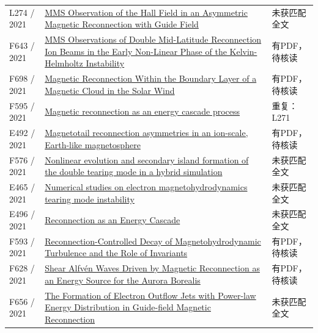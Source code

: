 \begin{longtable}{P{24mm}P{97mm}P{27mm}}
L274 / 2021 & \href{https://doi.org/10.3847/1538-4357/ac31b1}{MMS Observation of the Hall Field in an Asymmetric Magnetic Reconnection with Guide Field} & 未获匹配全文\\

F643 / 2021 & \href{https://doi.org/10.3389/fspas.2021.760885}{MMS Observations of Double Mid-Latitude Reconnection Ion Beams in the Early Non-Linear Phase of the Kelvin-Helmholtz Instability} & 有PDF，待核读\\

F698 / 2021 & \href{https://doi.org/10.1029/2021ja029415}{Magnetic Reconnection Within the Boundary Layer of a Magnetic Cloud in the Solar Wind} & 有PDF，待核读\\

F595 / 2021 & \href{https://doi.org/10.48550/arxiv.2104.12013}{Magnetic reconnection as an energy cascade process} & 重复：L271\\

E492 / 2021 & \href{https://doi.org/10.5194/angeo-39-991-2021}{Magnetotail reconnection asymmetries in an ion-scale,  Earth-like magnetosphere} & 有PDF，待核读\\

F576 / 2021 & \href{https://doi.org/10.1088/2058-6272/abe038}{Nonlinear evolution and secondary island formation of the double tearing mode in a hybrid simulation} & 未获匹配全文\\

E465 / 2021 & \href{https://doi.org/10.1063/5.0066269}{Numerical studies on electron magnetohydrodynamics tearing mode instability} & 未获匹配全文\\

E496 / 2021 & \href{https://doi.org/10.1002/essoar.10508377.1}{Reconnection as an Energy Cascade} & 未获匹配全文\\

F593 / 2021 & \href{https://doi.org/10.1103/physrevx.11.041005}{Reconnection-Controlled Decay of Magnetohydrodynamic Turbulence and the Role of Invariants} & 有PDF，待核读\\

F628 / 2021 & \href{https://doi.org/10.1029/2021gl094201}{Shear Alfvén Waves Driven by Magnetic Reconnection as an Energy Source for the Aurora Borealis} & 有PDF，待核读\\

F656 / 2021 & \href{https://doi.org/10.3847/1538-4357/abcf29}{The Formation of Electron Outflow Jets with Power-law Energy Distribution in Guide-field Magnetic Reconnection} & 未获匹配全文\\


\end{longtable}
